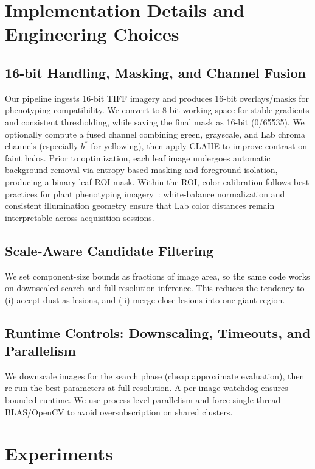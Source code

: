 \documentclass[journal]{IEEEtran}
\begin{document}
\section{Implementation Details and Engineering Choices}

\subsection{16-bit Handling, Masking, and Channel Fusion}
Our pipeline ingests 16-bit TIFF imagery and produces 16-bit overlays/masks for phenotyping compatibility.
We convert to 8-bit working space for stable gradients and consistent thresholding, while saving the final mask as 16-bit (0/65535).
We optionally compute a fused channel combining green, grayscale, and Lab chroma channels (especially $b^\ast$ for yellowing), then apply CLAHE to improve contrast on faint halos.
Prior to optimization, each leaf image undergoes automatic background removal via entropy-based masking and foreground isolation, producing a binary leaf ROI mask. Within the ROI, color calibration follows best practices for plant phenotyping imagery~\cite{berry2018color}: white-balance normalization and consistent illumination geometry ensure that Lab color distances remain interpretable across acquisition sessions.

\subsection{Scale-Aware Candidate Filtering}
We set component-size bounds as fractions of image area, so the same code works on downscaled search and full-resolution inference. This reduces the tendency to (i) accept dust as lesions, and (ii) merge close lesions into one giant region.

\subsection{Runtime Controls: Downscaling, Timeouts, and Parallelism}
We downscale images for the search phase (cheap approximate evaluation), then re-run the best parameters at full resolution. A per-image watchdog ensures bounded runtime. We use process-level parallelism and force single-thread BLAS/OpenCV to avoid oversubscription on shared clusters.

\section{Experiments}
\end{document}
